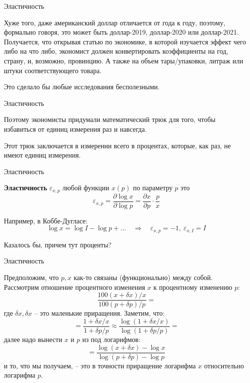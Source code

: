\documentclass{beamer}
\begin{document}
\begin{frame}{Эластичность}

Хуже того, даже американский доллар отличается от года к году, поэтому, формально говоря, это может быть доллар-2019, доллар-2020 или доллар-2021. Получается, что открывая статью по экономике, в которой изучается эффект чего либо на что либо, экономист должен конвертировать коэффициенты на год, страну, и, возможно, провинцию. А также на объем тары/упаковки, литраж или штуки соответствующего товара. 

Это сделало бы любые исследования бесполезными.

\end{frame}

\begin{frame}{Эластичность}

Поэтому экономисты придумали математический трюк для того, чтобы избавиться от единиц измерения раз и навсегда. 

Этот трюк заключается в измерении всего в процентах, которые, как раз, не имеют единиц измерения.

\end{frame}

\begin{frame}{Эластичность}

\begin{definition}
\textbf{Эластичность} $\varepsilon_{x,p}$ любой функции $x(p)$ по параметру $p$ это 
$$ \varepsilon_{x,p} = \frac{\partial \log x}{\partial \log p} = \frac{\partial x}{\partial p} \cdot \frac{p}{x}$$	
\end{definition}

Например, в Коббе-Дугласе:
$$\log x = \log I - \log p + \ldots \quad \Rightarrow \quad \varepsilon_{x,p} = -1, \ \varepsilon_{x,I} = I $$

Казалось бы, причем тут проценты?

\end{frame}

\begin{frame}{Эластичность}

Предположим, что $p,x$ как-то связаны (функционально) между собой. Рассмотрим отношение процентного изменения $x$ к процентному изменению $p$:
$$\frac{100 (x + \delta x) / x}{100 (p + \delta p) / p}=$$
где $\delta x, \delta x$ – это маленькие приращения. Заметим, что:
$$=\frac{1 + \delta x / x}{1 + \delta p / p} \approx \frac{\log(1 + \delta x / x)}{\log(1 + \delta p / p)}=$$
далее надо вынести $x$ и $p$ из под логарифмов:
$$=\frac{\log(x + \delta x) - \log x}{\log(p + \delta p) - \log p}$$
и то, что мы получаем, – это в точности приращение логарифма $x$ относительно логарифма $p$.

\end{frame}
\end{document}
